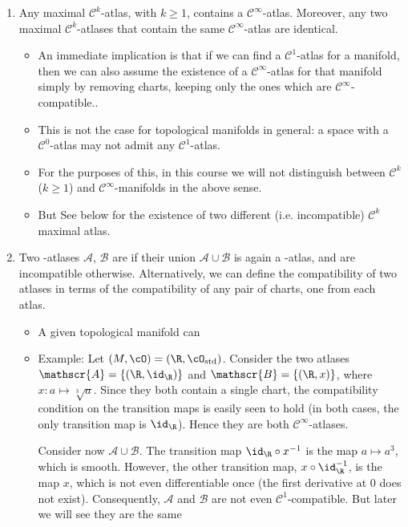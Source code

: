\documentclass{article}
\begin{document}
\begin{enumerate}
\item {} Any maximal $\mathcal{C}^k$-atlas, with $k\geq 1$, contains a $\mathcal{C}^\infty$-atlas. Moreover, any two maximal $\mathcal{C}^k$-atlases that contain the same $\mathcal{C}^\infty$-atlas are identical.
\begin{itemize}
    \item An immediate implication is that if we can find a $\mathcal{C}^1$-atlas for a manifold, then we can also assume the existence of a $\mathcal{C}^\infty$-atlas for that manifold simply by removing charts, keeping only the ones which are $\mathcal{C}^\infty$-compatible.. 
    \item This is not the case for topological manifolds in general: a space with a $\mathcal{C}^0$-atlas may not admit any $\mathcal{C}^1$-atlas.
   \item  For the purposes of this, in this course we will not distinguish between $\mathcal{C}^k$ ($k\ge 1$) and $\mathcal{C}^\infty$-manifolds in the above sense.
    \item But  See below for the existence of two different (i.e. incompatible) $\mathcal{C}^k$ maximal atlas.
\end{itemize}
 \item {} Two {\scalebox{0.75}\FiveFlowerOpen}-atlases $\mathscr{A}$, $\mathscr{B}$ are  if their union $\mathscr{A}\cup\mathscr{B}$ is again a {\scalebox{0.75}\FiveFlowerOpen}-atlas, and are incompatible otherwise.
{\tiny Alternatively, we can define the compatibility of two atlases in terms of the compatibility of any pair of charts, one from each atlas.}
\begin{itemize}
    \item A given topological manifold can 
    \item Example: Let $(M,\cO)=(\R,\cO_\mathrm{std})$. Consider the two atlases $\mathscr{A}=\{(\R,\id_\R)\}$ and $\mathscr{B}=\{(\R,x)\}$, where $x: a \mapsto \sqrt[3]{a}$. Since they both contain a single chart, the compatibility condition on the transition maps is easily seen to hold (in both cases, the only transition map is $\id_\R$). Hence they are both $\mathcal{C}^\infty$-atlases.

Consider now $\mathscr{A}\cup\mathscr{B}$. The transition map $\id_\R\circ x^{-1}$ is the map $a\mapsto a^3$, which is smooth. However, the other transition map, $x\circ\id_\R^{-1}$, is the map $x$, which is not even differentiable once (the first derivative at $0$ does not exist). Consequently, $\mathscr{A}$ and $\mathscr{B}$ are not even $\mathcal{C}^1$-compatible. But later we will see they are the same 
\end{itemize} 
    

\end{enumerate}
\end{document}
